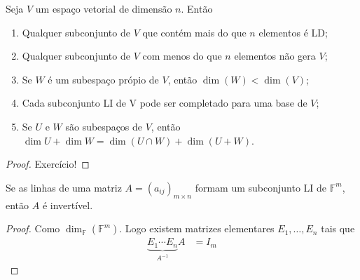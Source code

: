 \begin{proposition}
	Seja $V$ um espaço vetorial de dimensão $n$.
	Então
	\begin{enumerate}
		\item Qualquer subconjunto de $V$ que contém mais do que $n$ elementos é LD;
		\item Qualquer subconjunto de $V$ com menos do que $n$ elementos não gera $V$;
		\item Se $W$ é um subespaço própio de $V$, então $\dim\left(W\right)<\dim\left(V\right)$;
		\item Cada subconjunto LI de V pode ser completado para uma base de $V$;
		\item Se $U$ e $W$ são subespaços de $V$, então $\dim U+\dim W=\dim\left(U\cap W\right)+\dim\left(U+W\right)$.
	\end{enumerate}
\end{proposition}

\begin{proof}
	Exercício!
\end{proof}

\begin{proposition}
	Se as linhas de uma matriz $A={\left(a_{ij}\right)}_{m\times n}$
	formam um subconjunto LI de $\mathbb{F}^{m}$, então $A$ é invertível.
\end{proposition}

\begin{proof}
	Como $\dim_{\mathbb{F}}\left(\mathbb{F}^{m}\right)$.
	Logo existem matrizes elementares $E_{1},\dotsc,E_{n}$ tais que
	\begin{align*}
		\underbrace{E_{1}\dotsb E_{n}}_{A^{-1}}A
		 & =I_{m}
	\end{align*}

\end{proof}
